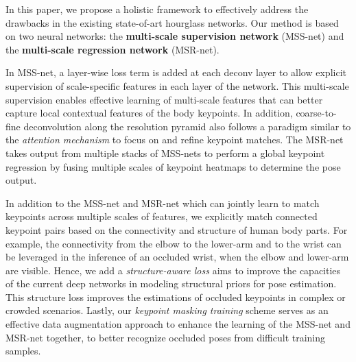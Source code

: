 \documentclass[runningheads]{llncs}
\begin{document}
In this paper, we propose a holistic framework to effectively address the drawbacks in the existing state-of-art hourglass networks. Our method is based on two neural networks: the {\bf multi-scale supervision network} (MSS-net) and the {\bf multi-scale regression network} (MSR-net).

In MSS-net, a layer-wise loss term is added at each deconv layer to allow explicit supervision of scale-specific features in each layer of the network. This multi-scale supervision enables effective learning of multi-scale features that can better capture local contextual features of the body keypoints. In addition, coarse-to-fine deconvolution along the resolution pyramid also follows a paradigm similar to the {\em attention mechanism} to focus on and refine keypoint matches.
The MSR-net takes output from multiple stacks of MSS-nets to perform a global keypoint regression by fusing multiple scales of keypoint heatmaps to determine the pose output.

In addition to the MSS-net and MSR-net which can jointly learn to match keypoints across multiple scales of features, we explicitly match connected keypoint pairs based on the connectivity and structure of human body parts. For example, the connectivity from the elbow to the lower-arm and to the wrist can be leveraged in the inference of an occluded wrist, when the elbow and lower-arm are visible. Hence, we add a {\em structure-aware loss} aims to improve the capacities of the current deep networks in modeling structural priors for pose estimation. This structure loss improves the estimations of occluded keypoints in complex or crowded scenarios.  Lastly, our {\em keypoint masking training} scheme serves as an effective data augmentation approach to enhance the learning of the MSS-net and MSR-net together, to better recognize occluded poses from difficult training samples.
\end{document}
